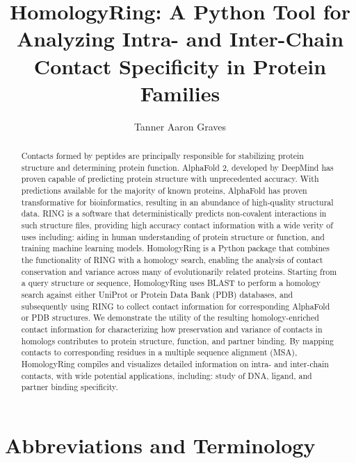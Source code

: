 \documentclass[11pt]{article} %
\title{HomologyRing: A Python Tool for Analyzing Intra- and Inter-Chain Contact Specificity in Protein Families}
\author{Tanner Aaron Graves}
\begin{document}
\maketitle

\begin{abstract}
Contacts formed by peptides are principally responsible for stabilizing protein structure and determining protein function. AlphaFold 2, developed by DeepMind has proven capable of predicting protein structure with unprecedented accuracy. With predictions available for the majority of known proteins, AlphaFold has proven transformative for bioinformatics, resulting in an abundance of high-quality structural data. RING is a software that deterministically predicts non-covalent interactions in such structure files, providing high accuracy contact information with a wide verity of uses including: aiding in human understanding of protein structure or function, and training machine learning models. HomologyRing is a Python package that combines the functionality of RING with a homology search, enabling the analysis of contact conservation and variance across many of evolutionarily related proteins. Starting from a query structure or sequence, HomologyRing uses BLAST to perform a homology search against either UniProt or Protein Data Bank (PDB) databases, and subsequently using RING to collect contact information for corresponding AlphaFold or PDB structures. We demonstrate the utility of the resulting homology-enriched contact information for characterizing how preservation and variance of contacts in homologs contributes to protein structure, function, and partner binding. By mapping contacts to corresponding residues in a multiple sequence alignment (MSA), HomologyRing compiles and visualizes detailed information on intra- and inter-chain contacts, with wide potential applications, including: study of DNA, ligand, and partner binding specificity. 
\end{abstract}

\newpage
\tableofcontents
\newpage

\section*{Abbreviations and Terminology}
\end{document}
